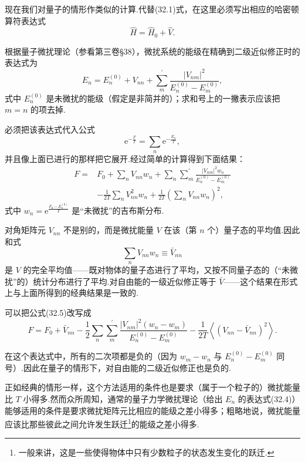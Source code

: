 现在我们对量子的情形作类似的计算.代替(32.1)式，在这里必须写出相应的哈密顿算符表达式
\begin{equation*}
  \hat{H}=\hat{H}_0+\hat{V}.
\end{equation*}

根据量子微扰理论（参看第三卷§38），微扰系统的能级在精确到二级近似修正时的表达式为
\begin{equation}
  E_n=E_n^{(0)}+V_{nn}+\sum_m^{\prime}\frac{|V_{nm}|^2}{E_n^{(0)}-E_m^{(0)}},
\end{equation}
式中 $E_n^{(0)}$ 是未微扰的能级（假定是非简并的）；求和号上的一撇表示应该把 $m=n$ 的项去掉.

必须把该表达式代入公式
\begin{equation*}
  \mathrm{e}^{-\frac{F}{T}}=\sum_n\mathrm{e}^{-\frac{E_n}{T}},
\end{equation*}
并且像上面已进行的那样把它展开.经过简单的计算得到下面结果：
\begin{equation}
\begin{aligned}
  F={}&F_0+\sum_nV_{nn}w_n+\sum_n\sum_m^{\prime}
  \frac{|V_{nm}|^2w_n}{E_n^{(0)}-E_m^{(0)}}\\
  &-\frac{1}{2T}\sum_nV_{nn}^2w_n+\frac{1}{2T}\left(\sum_nV_{nn}w_n\right)^2,
\end{aligned}
\end{equation}
式中 $w_n=\mathrm{e}^{\frac{F_0-E_n^{(0)}}{T}}$ 是“未微扰”的吉布斯分布.

对角矩阵元 $V_{nn}$ 不是别的，而是微扰能量 $V$ 在该（第 $n$ 个）量子态的平均值.因此和式
\begin{equation*}
  \sum_nV_{nn}w_n\equiv\bar{V}_{nn}
\end{equation*}
是 $V$ 的完全平均值——既对物体的量子态进行了平均，又按不同量子态的（“未微扰”的）统计分布进行了平均.对自由能的一级近似修正等于 $\bar{V}$——这个结果在形式上与上面所得到的经典结果是一致的.

可以把公式(32.5)改写成
\begin{equation}
  F=F_0+\bar{V}_{nn}-\frac{1}{2}\sum_n\sum_m^{\prime}
  \frac{|V_{nm}|^2(w_n-w_m)}{E_n^{(0)}-E_m^{(0)}}
  -\frac{1}{2T}\left\langle(V_{nn}-\bar{V}_{nn})^2\right\rangle.
\end{equation}

在这个表达式中，所有的二次项都是负的（因为 $w_m-w_n$ 与 $E_n^{(0)}-E_m^{(0)}$ 同号）.因此在量子的情形下，对自由能的二级近似修正也是负的.

正如经典的情形一样，这个方法适用的条件也是要求（属于一个粒子的）微扰能量比 $T$ 小得多.然而众所周知，通常的量子力学微扰理论（给出 $E_n$ 的表达式(32.4)）能够适用的条件是要求微扰矩阵元比相应的能级之差小得多；粗略地说，微扰能量应该比那些彼此之间允许发生跃迁\footnote{一般来讲，这是一些使得物体中只有少数粒子的状态发生变化的跃迁.}的能级之差小得多.

